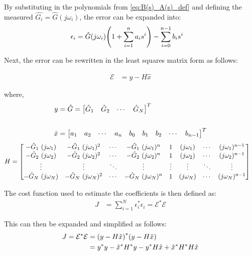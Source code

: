 \documentclass[]{article}
\newcommand{\Epsilon}{\mathcal{E}}
\begin{document}
	By substituting in the polynomials from \eqref{eq:B(s)_A(s)_def} and defining the measured $\hat{G_i} = \hat{G}(j\omega_i)$, the error can be expanded into:
	\begin{align}
		\epsilon_i &= \hat{G}(j\omega_i) \qty(1 + \sum_{i=1}^{n} a_i s^i) - \sum_{i=0}^{n-1} b_i s^i
	\end{align}

	Next, the error can be rewritten in the least squares matrix form as follows:
	
	\begin{align}
		\Epsilon &= y - H \hat{x} \label{eq:error_def}
	\end{align}

	where,
	\begin{align}
		y &= \hat{G} = \mqty[\hat{G}_1 & \hat{G}_2 & \cdots & \hat{G}_N]^T \label{eq:y_def}\\ \nonumber\\
		\hat{x} &= \mqty[a_1 & a_2 & \cdots & a_n & b_0 & b_1 & b_2 & \cdots & b_{n-1}]^T \label{eq:x_def}
	\end{align}
	\begin{align}
		H &= \mqty[
					-\hat{G}_1 \ (j\omega_1) & -\hat{G}_1 \ (j\omega_1)^2 & \cdots & -\hat{G}_1 \ (j\omega_1)^n & 1 & (j\omega_1)  & \cdots &  (j\omega_1)^{n-1}\\
					-\hat{G}_2 \ (j\omega_2) & -\hat{G}_2 \ (j\omega_2)^2 & \cdots & -\hat{G}_2 \ (j\omega_2)^n & 1 & (j\omega_2)  & \cdots &  (j\omega_2)^{n-1}\\
					\vdots & \vdots & \ddots & \vdots & \vdots & \vdots  & \ddots & \vdots\\
					-\hat{G}_N \ (j\omega_N) & -\hat{G}_N \ (j\omega_N)^2 & \cdots & -\hat{G}_N \ (j\omega_N)^n & 1 & (j\omega_N) & \cdots &  (j\omega_N)^{n-1}] \label{eq:H_def}
	\end{align}
	
	\newpage
	The cost function used to estimate the coefficients is then defined as:
	\begin{align}
		J & = \sum_{i=1}^N \epsilon_i^* \epsilon_i = \Epsilon^* \Epsilon
	\end{align}
	
	This can then be expanded and simplified as follows:
	\begin{align}
		J = \Epsilon ^* \Epsilon 	&= \qty(y - H \hat{x})^* \qty(y - H \hat{x})\\ \nonumber
									&= y^* y - \hat{x}^* H^* y - y^* H \hat{x} + \hat{x}^* H^* H \hat{x}
	\end{align}
	
\end{document}
